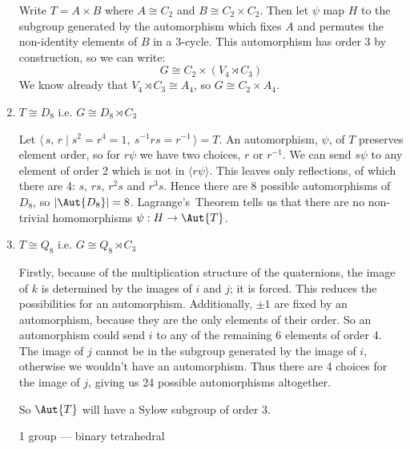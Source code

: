 \begin{enumerate}
        Write \(T = A \times B\) where \(A \cong C_2\) and \(B \cong C_2 \times C_2\).
        Then let \(\psi\) map \(H\) to the subgroup generated by the automorphism which fixes \(A\) and permutes the
        non-identity elements of \(B\) in a 3-cycle.
        This automorphism has order 3 by construction, so we can write:
        \[G \cong C_2 \times (V_4 \rtimes C_3)\]
        We know already that \(V_4 \rtimes C_3 \cong A_4\), so \(G \cong C_2 \times A_4\).

    \item \(T \cong D_8\) i.e. \(G \cong D_8 \rtimes C_3\)

        Let \(\langle\,s,\,r \mid s^2 = r^4 = 1,\ s^{-1}rs = r^{-1}\,\rangle = T\).
        An automorphism, \(\psi\), of \(T\) preserves element order, so for \(r\psi\) we have two choices, \(r\) or
        \(r^{-1}\).
        We can send \(s\psi\) to any element of order 2 which is not in \(\langle r\psi \rangle\).
        This leaves only reflections, of which there are 4: \(s,\,rs,\,r^2s\) and \(r^3s\).
        Hence there are 8 possible automorphisms of \(D_8\), so \(|\Aut{D_8}| = 8\).
        Lagrange's~Theorem tells us that there are no non-trivial homomorphisms \(\psi:H \to \Aut{T}\).

    \item \(T \cong Q_8\) i.e. \(G \cong Q_8 \rtimes C_3\)

        Firstly, because of the multiplication structure of the quaternions, the image of \(k\) is determined by the
        images of \(i\) and \(j\); it is forced.
        This reduces the possibilities for an automorphism.
        Additionally, \(\pm 1\) are fixed by an automorphism, because they are the only elements of their order.
        So an automorphism could send \(i\) to any of the remaining 6 elements of order 4.
        The image of \(j\) cannot be in the subgroup generated by the image of \(i\), otherwise we wouldn't have an
        automorphism.
        Thus there are 4 choices for the image of \(j\), giving us 24 possible automorphisms altogether.

        So \(\Aut{T}\) will have a Sylow subgroup of order 3.


        1 group --- binary tetrahedral
\end{enumerate}


